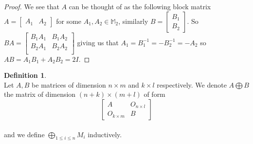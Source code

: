 \documentclass[12pt]{article}
\theoremstyle{definition}
\newtheorem{definition}[theorem]{Definition}
\theoremstyle{remark}
\theoremstyle{plain}
\begin{document}
\begin{proof}
    We see that $A$ can be thought of as the following block matrix $A=\begin{bmatrix}
        A_1 & A_2
    \end{bmatrix}$ for some $A_1,A_2\in \mathbb{M}_{2}$, similarly $B=\begin{bmatrix}
        B_1 \\ B_2
    \end{bmatrix}$.
    So $BA=\begin{bmatrix}
        B_1A_1 & B_1A_2\\
        B_2A_1 & B_2A_2\\
    \end{bmatrix}$ giving us that $A_1=B_1^{-1}=-B_2^{-1}=-A_2$ so $AB=A_1B_1+A_2B_2=2I$.
\end{proof}
\begin{definition}\leavevmode \\
Let $A,B$ be matrices of dimension $n\times m$ and $k\times l$ respectively. We denote $A \bigoplus B$ the matrix of dimension $ (n+k)\times(m+l) $ of form \[ \begin{bmatrix}
	A & O_{n \times l}\\
	O_{k \times m} & B
\end{bmatrix} \]\\
and we define $\bigoplus_{1\leq i \leq n}M_i$ inductively.
\end{definition}
\end{document}
